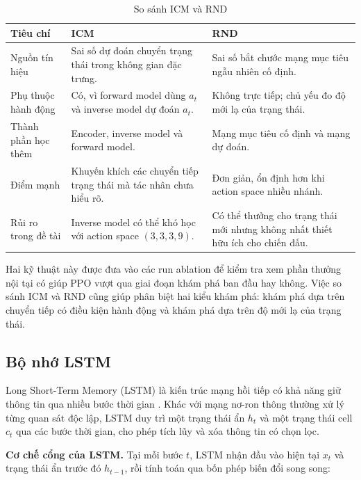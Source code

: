 \begin{table}[H]
    \centering
    \small
    \caption{So sánh ICM và RND}
    \label{tab:icm_rnd_compare}
    \begin{tabular}{|p{3.1cm}|p{5.0cm}|p{5.0cm}|}
        \hline
        \textbf{Tiêu chí} & \textbf{ICM} & \textbf{RND} \\
        \hline
        Nguồn tín hiệu & Sai số dự đoán chuyển trạng thái trong không gian đặc trưng. & Sai số bắt chước mạng mục tiêu ngẫu nhiên cố định. \\
        \hline
        Phụ thuộc hành động & Có, vì forward model dùng $a_t$ và inverse model dự đoán $a_t$. & Không trực tiếp; chủ yếu đo độ mới lạ của trạng thái. \\
        \hline
        Thành phần học thêm & Encoder, inverse model và forward model. & Mạng mục tiêu cố định và mạng dự đoán. \\
        \hline
        Điểm mạnh & Khuyến khích các chuyển tiếp trạng thái mà tác nhân chưa hiểu rõ. & Đơn giản, ổn định hơn khi action space nhiều nhánh. \\
        \hline
        Rủi ro trong đề tài & Inverse model có thể khó học với action space $(3,3,3,9)$. & Có thể thưởng cho trạng thái mới nhưng không nhất thiết hữu ích cho chiến đấu. \\
        \hline
    \end{tabular}
\end{table}

Hai kỹ thuật này được đưa vào các run ablation để kiểm tra xem phần thưởng nội tại có giúp PPO vượt qua giai đoạn khám phá ban đầu hay không. Việc so sánh ICM và RND cũng giúp phân biệt hai kiểu khám phá: khám phá dựa trên chuyển tiếp có điều kiện hành động và khám phá dựa trên độ mới lạ của trạng thái.

\subsection{Bộ nhớ LSTM}

Long Short-Term Memory (LSTM) là kiến trúc mạng hồi tiếp có khả năng giữ thông tin qua nhiều bước thời gian \cite{Hochreiter1997}. Khác với mạng nơ-ron thông thường xử lý từng quan sát độc lập, LSTM duy trì một trạng thái ẩn $h_t$ và một trạng thái cell $c_t$ qua các bước thời gian, cho phép tích lũy và xóa thông tin có chọn lọc.

\textbf{Cơ chế cổng của LSTM.} Tại mỗi bước $t$, LSTM nhận đầu vào hiện tại $x_t$ và trạng thái ẩn trước đó $h_{t-1}$, rồi tính toán qua bốn phép biến đổi song song:

